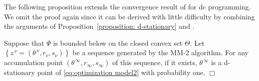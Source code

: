 \documentclass{siamart}
\begin{document}
The following proposition extends the  convergence result of \cite[Proposition 7]{PangRazaviyaynAlvarado16} for dc programming.
We omit the proof again since it can be derived with little difficulty by combining the arguments of
Proposition~\ref{proposition: d-stationary} and \cite[Proposition 7]{PangRazaviyaynAlvarado16}.
\begin{proposition}\label{proposition:MMrandom}
Suppose that $\Psi$ is bounded below on the closed convex set $\Theta$.
Let $\left\{ z^{\, \nu} = ( \theta^{\, \nu}, r_\nu, s_\nu) \right\}$ be a sequence generated by the MM-2 algorithm. For any accumulation point $( \theta^{\, \infty},r_{\infty},s_{\infty} )$ of this sequence, if it exists,
$\theta^{\, \infty}$ is a d-stationary point of \eqref{eq:optimization model2} with probability one.  \hfill $\Box$
\end{proposition}

\end{document}
